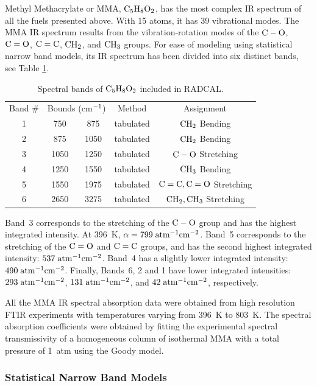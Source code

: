 Methyl Methacrylate or MMA, $\rm C_5H_8O_2$, has the most complex IR spectrum of all the fuels presented above. With 15 atoms, it has 39 vibrational modes. The MMA IR spectrum results from the vibration-rotation modes of the $\rm C-O$, $\rm C=O$, $\rm C=C$, $\rm CH_2$, and $\rm CH_3$ groups. For ease of modeling using statistical narrow band models, its IR spectrum has been divided into six distinct bands, see Table \ref{Table::C5H8O2}.
\begin{table}[ht]
   \centering
   \caption{Spectral bands of $\rm C_5H_8O_2$ included in RADCAL.}
   \vspace{0.1in}
   \label{Table::C5H8O2}
    \begin{tabular}{|c|c|c|c|c|}
    \hline
    Band \# & \multicolumn{2}{|l|}{Bounds (cm$\rm ^{-1}$) } & Method & Assignment \\
    \cline{1-5}
    1 & 750  & 875  & tabulated & $\rm CH_2$ Bending \\
    2 & 875  & 1050 & tabulated & $\rm CH_2$ Bending \\
    3 & 1050 & 1250 & tabulated & $\rm C-O$ Stretching \\
    4 & 1250 & 1550 & tabulated & $\rm CH_3$ Bending \\
    5 & 1550 & 1975 & tabulated & $\rm C=C, C=O$ Stretching \\
    6 & 2650 & 3275 & tabulated & $\rm CH_2, CH_3$ Stretching \\
    \hline
   \end{tabular}
\end{table}
Band~3 corresponds to the stretching of the $\rm C-O$ group and has the highest integrated intensity. At 396~K, $\alpha = 799\;\rm {atm^{-1}cm^{-2}}$. Band~5 corresponds to the stretching of the $\rm C=O$ and $\rm C=C$ groups, and has the second highest integrated intensity: $537\;\rm {atm^{-1}cm^{-2}}$. Band~4 has a slightly lower integrated intensity: $490\;\rm {atm^{-1}cm^{-2}}$. Finally, Bands~6, 2 and 1 have lower integrated intensities: $293\;\rm {atm^{-1}cm^{-2}}$,
$131\;\rm {atm^{-1}cm^{-2}}$, and $42\;\rm {atm^{-1}cm^{-2}}$, respectively.

All the MMA IR spectral absorption data were obtained from high resolution FTIR experiments with temperatures varying from 396~K to 803~K. The spectral absorption coefficients were obtained by fitting the experimental spectral transmissivity of a homogeneous column of isothermal MMA with a total pressure of 1~atm using the Goody model.

\subsubsection{Statistical Narrow Band Models}

